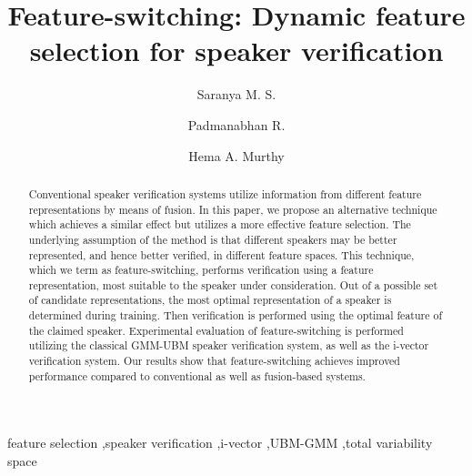\documentclass[preprint,12pt,5p]{elsarticle}
\begin{document}
\sloppy
\flushend

\begin{frontmatter}

\title{ {\bf Feature-switching: Dynamic feature selection for speaker verification}}

\author[label1]{Saranya M. S.}
\address[label1]{Indian Institute of Technology Madras}


\author[label2]{Padmanabhan R.}
\address[label2]{Indian Institute of Technology Mandi}

\author[label1]{Hema A. Murthy}

\begin{abstract}
Conventional speaker verification systems utilize information from different
feature representations by means of fusion. In this paper, we propose an
alternative technique which achieves a similar effect but 
utilizes a more effective feature selection. The underlying assumption of the 
method is that different speakers may be better represented, and hence better 
verified, in different feature spaces.  This technique, which we term as feature-switching, 
performs verification using a feature representation, most suitable to the
speaker under consideration. %
Out of a possible set of candidate representations, the most optimal
representation of a speaker is determined during training. Then verification is
performed using the optimal feature of the claimed speaker. Experimental evaluation
of feature-switching is performed utilizing the classical GMM-UBM speaker
verification system, as well as the i-vector verification system. Our results show
that feature-switching achieves improved performance compared to conventional as well
as fusion-based systems.
\end{abstract}

\begin{keyword}
feature selection  \sep speaker verification \sep i-vector \sep UBM-GMM \sep total variability space 
\end{keyword}

\end{frontmatter}
\end{document}
